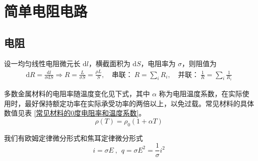 \documentclass[UTF8]{report}
\theoremstyle{MyLineTheoremStyle} %
\theoremstyle{MyBlockTheoremStyle} %
\theoremstyle{MySubsubsectionStyle} %
\begin{document}
\chapter{简单电阻电路}\thispagestyle{fancy}
\section{电阻}
设一均匀线性电阻微元长 $\mathrm{d} l$，横截面积为 $\mathrm{d}S$，电阻率为 $\sigma$，则阻值为
\begin{gather}
    \mathrm{d}R = \frac{\mathrm{d} l}{\sigma\mathrm{d}S} \Longrightarrow R = \frac{L}{\sigma S} = \frac{\rho L}{S},\quad 
\text{串联：}\ R = \sum_{i}R_i,\quad 
\text{并联：}\ \frac{1}{R} = \sum_{i}\frac{1}{R_i} 
\end{gather}

多数金属材料的电阻率随温度变化见下式，其中 $\alpha$ 称为电阻温度系数，在实际使用时，最好保持额定功率在实际承受功率的两倍以上，以免过载。常见材料的具体数值见表 \ref{常见材料的0度电阻率和温度系数}。
\begin{equation}
\rho(T) = \rho_0(1+\alpha T)
\end{equation}
\begin{table}[H]\centering\small
    \setlength{\tabcolsep}{2mm} %
    \caption{\textbf{常见材料的 0 \textdegree C 电阻率和温度系数 }}
    \label{常见材料的0度电阻率和温度系数}
\end{table}


我们有欧姆定律微分形式和焦耳定律微分形式
\begin{equation}
i = \sigma E\ ,\ \ q =  \sigma E^2 = \frac{1}{\sigma} i^2  
\end{equation}
\end{document}
